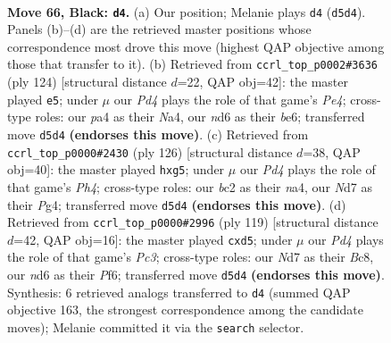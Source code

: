 \documentclass[11pt]{article}
\begin{document}
\clearpage

\begin{figure}[p]\centering
\begin{subfigure}{0.46\textwidth}\centering
\resizebox{\linewidth}{!}{%
\newchessgame
\chessboard[
  setfen={n7/3n2k1/1b1N4/p2p4/P3P3/1P5p/2B1P3/4K3 b - - 0 66},
  showmover=false,
  pgfstyle=straightmove, color=movearrow, markmove={d5-d4}
]}
\caption{}
\end{subfigure}\hfill
\begin{subfigure}{0.46\textwidth}\centering
\resizebox{\linewidth}{!}{%
\newchessgame
\chessboard[
  setfen={n3nk2/6p1/4b2p/5p2/N3PP2/7P/3N4/5BK1 w - - 0 63},
  showmover=false,
  pgfstyle=straightmove, color=movearrow, markmove={e4-e5}
]}
\caption{}
\end{subfigure}
\\[4pt]
\begin{subfigure}{0.46\textwidth}\centering
\resizebox{\linewidth}{!}{%
\newchessgame
\chessboard[
  setfen={2b5/8/3kp2p/NPp3p1/n1P3PP/3BK3/8/8 w - - 0 64},
  showmover=false,
  pgfstyle=straightmove, color=movearrow, markmove={h4-g5}
]}
\caption{}
\end{subfigure}\hfill
\begin{subfigure}{0.46\textwidth}\centering
\resizebox{\linewidth}{!}{%
\newchessgame
\chessboard[
  setfen={2bk4/8/pPp2p2/P1BB2p1/3P4/2K3P1/8/8 b - - 0 60},
  showmover=false,
  pgfstyle=straightmove, color=movearrow, markmove={c6-d5}
]}
\caption{}
\end{subfigure}
\caption{\textbf{Move 66, Black: \texttt{d4}.} (a) Our position; Melanie plays \texttt{d4} (\texttt{d5d4}). Panels (b)--(d) are the retrieved master positions whose correspondence most drove this move (highest QAP objective among those that transfer to it). (b) Retrieved from \texttt{ccrl\_top\_p0002\#3636} (ply 124) [structural distance $d$=22, QAP obj=42]: the master played \texttt{e5}; under $\mu$ our \emph{Pd4} plays the role of that game's \emph{Pe4}; cross-type roles: our \emph{p}a4 as their \emph{N}a4, our \emph{n}d6 as their \emph{b}e6; transferred move \texttt{d5d4} \textbf{(endorses this move)}. (c) Retrieved from \texttt{ccrl\_top\_p0000\#2430} (ply 126) [structural distance $d$=38, QAP obj=40]: the master played \texttt{hxg5}; under $\mu$ our \emph{Pd4} plays the role of that game's \emph{Ph4}; cross-type roles: our \emph{b}c2 as their \emph{n}a4, our \emph{N}d7 as their \emph{P}g4; transferred move \texttt{d5d4} \textbf{(endorses this move)}. (d) Retrieved from \texttt{ccrl\_top\_p0000\#2996} (ply 119) [structural distance $d$=42, QAP obj=16]: the master played \texttt{cxd5}; under $\mu$ our \emph{Pd4} plays the role of that game's \emph{Pc3}; cross-type roles: our \emph{N}d7 as their \emph{B}c8, our \emph{n}d6 as their \emph{P}f6; transferred move \texttt{d5d4} \textbf{(endorses this move)}. Synthesis: 6 retrieved analogs transferred to \texttt{d4} (summed QAP objective 163, the strongest correspondence among the candidate moves); Melanie committed it via the \texttt{search} selector.}
\label{fig:thought-m131}
\end{figure}
\end{document}
